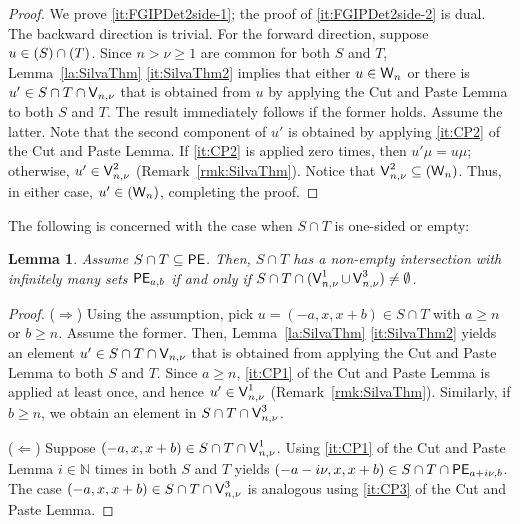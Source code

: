 \documentclass[reqno]{amsart}
\theoremstyle{plain}
\newtheorem{lem}{Lemma}[section]
\theoremstyle{definition}
\let\P\relax
\DeclareMathOperator{\P}{\textup{\textsf{P}}}
\DeclareMathOperator{\PE}{\textup{\textsf{PE}}}
\DeclareMathOperator{\W}{\textup{\textsf{W}}}
\DeclareMathOperator{\V}{\textup{\textsf{V}}}
\numberwithin{equation}{section}
\begin{document}
\begin{proof}
We prove \ref{it:FGIPDet2side-1}; the proof of \ref{it:FGIPDet2side-2} is dual. The backward direction is trivial. For the forward direction, suppose $u\in \P(S)\cap \P(T)$. Since $n> \nu \geq 1$ are common for both $S$ and $T$, Lemma~\ref{la:SilvaThm} \ref{it:SilvaThm2} implies that either $u\in \W_{n}$ or there is $u'\in S\cap T\cap \V_{n,\nu}$ that is obtained from $u$ by applying the Cut and Paste Lemma to both $S$ and $T$. The result immediately follows if the former holds. Assume the latter. Note that the second component of $u'$ is obtained by applying \ref{it:CP2} of the Cut and Paste Lemma. If \ref{it:CP2} is applied zero times, then $u'\mu = u\mu$; otherwise, $u'\in \V_{n,\nu}^2$ (Remark~\ref{rmk:SilvaThm}). Notice that $\V_{n,\nu}^2\subseteq \P(\W_{n})$. Thus, in either case, $u'\in \P(\W_{n})$, completing the proof.
\end{proof}





The following is concerned with the case when $S\cap T$ is one-sided or empty:

\begin{lem}
\label{lem:FGIP1sideorEmpty}
Assume $S\cap T\subseteq\PE$. Then, $S\cap T$ has a non-empty intersection with infinitely many sets $\PE_{a,b}$ if and only if $S\cap T\cap (\V_{n,\nu}^1\cup \V_{n,\nu}^3) \neq \emptyset$.
\end{lem}


\begin{proof}
($\Rightarrow$) Using the assumption, pick $u = (-a, x, x+b) \in S\cap T$ with $a\geq n$ or $b\geq n$. Assume the former. Then, Lemma~\ref{la:SilvaThm} \ref{it:SilvaThm2} yields an element $u'\in S\cap T\cap \V_{n,\nu}$ that is obtained from applying the Cut and Paste Lemma to both $S$ and $T$. Since $a\geq n$, \ref{it:CP1} of the Cut and Paste Lemma is applied at least once, and hence $u'\in \V_{n,\nu}^1$ (Remark~\ref{rmk:SilvaThm}). Similarly, if $b\geq n$, we obtain an element in $S\cap T\cap \V_{n,\nu}^3$.



\noindent ($\Leftarrow$)
Suppose $(-a, x, x+b)\in S\cap T\cap \V_{n,\nu}^1$.
Using \ref{it:CP1} of the Cut and Paste Lemma $i\in\mathbb{N}$ times in both $S$ and $T$ yields
$(-a-i\nu,x,x+b)\in S\cap T\cap \PE_{a+i\nu,b}$.
The case $(-a, x, x+b)\in S\cap T\cap \V_{n,\nu}^3$ is analogous using 
\ref{it:CP3} of the Cut and Paste Lemma.
\end{proof}
\end{document}
